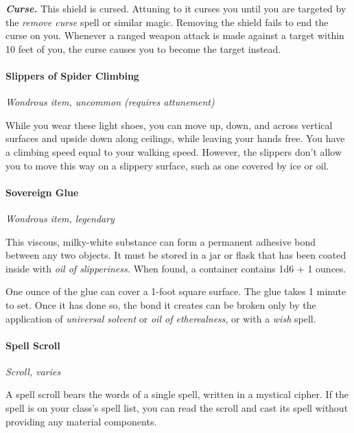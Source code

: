 \documentclass[
]{article}
\begin{document}
\emph{\textbf{Curse.}} This shield is cursed. Attuning to it curses you
until you are targeted by the \emph{remove curse} spell or similar
magic. Removing the shield fails to end the curse on you. Whenever a
ranged weapon attack is made against a target within 10 feet of you, the
curse causes you to become the target instead.

\hypertarget{slippers-of-spider-climbing}{%
\paragraph{Slippers of Spider
Climbing}\label{slippers-of-spider-climbing}}

\emph{Wondrous item, uncommon (requires attunement)}

While you wear these light shoes, you can move up, down, and across
vertical surfaces and upside down along ceilings, while leaving your
hands free. You have a climbing speed equal to your walking speed.
However, the slippers don't allow you to move this way on a slippery
surface, such as one covered by ice or oil.

\hypertarget{sovereign-glue}{%
\paragraph{Sovereign Glue}\label{sovereign-glue}}

\emph{Wondrous item, legendary}

This viscous, milky-white substance can form a permanent adhesive bond
between any two objects. It must be stored in a jar or flask that has
been coated inside with \emph{oil of slipperiness.} When found, a
container contains 1d6 + 1 ounces.

One ounce of the glue can cover a 1-foot square surface. The glue takes
1 minute to set. Once it has done so, the bond it creates can be broken
only by the application of \emph{universal solvent} or \emph{oil of
etherealness}, or with a \emph{wish} spell.

\hypertarget{spell-scroll}{%
\paragraph{Spell Scroll}\label{spell-scroll}}

\emph{Scroll, varies}

A spell scroll bears the words of a single spell, written in a mystical
cipher. If the spell is on your class's spell list, you can read the
scroll and cast its spell without providing any material components.
\end{document}
